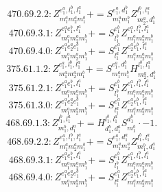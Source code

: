 \documentclass[letterpaper,10pt,fleqn,leqno,onecolumn]{article}
\begin{document}
\begin{equation} \;\;\;\;\;\;  470.69.2.2: Z^{e_{1}^{a},l_{1}^{b},l_{1}^{a}}_{m_{1}^{a}m_{2}^{a}m_{1}^{b}}+=S^{e_{1}^{a},d_{1}^{b}}_{m_{1}^{a}m_{1}^{b}}Z^{l_{1}^{b},l_{1}^{a}}_{m_{2}^{a},d_{1}^{b}} \end{equation}
\begin{equation} \;\;\;\;\;\;  470.69.3.1: Z^{e_{1}^{a}e_{1}^{b},l_{1}^{a}}_{m_{1}^{a}m_{2}^{a}m_{1}^{b}}+=S^{e_{1}^{b}}_{l_{1}^{b}}Z^{e_{1}^{a},l_{1}^{b},l_{1}^{a}}_{m_{1}^{a}m_{2}^{a}m_{1}^{b}} \end{equation}
\begin{equation} \;\;\;\;\;\;  470.69.4.0: Z^{e_{1}^{a}e_{2}^{a}e_{1}^{b}}_{m_{1}^{a}m_{2}^{a}m_{1}^{b}}+=S^{e_{1}^{a}}_{l_{1}^{a}}Z^{e_{2}^{a}e_{1}^{b},l_{1}^{a}}_{m_{1}^{a}m_{2}^{a}m_{1}^{b}} \end{equation}
\begin{equation} \;\;\;\;\;\;  375.61.1.2: Z^{e_{1}^{a},l_{1}^{b},l_{1}^{a}}_{m_{1}^{a}m_{2}^{a}m_{1}^{b}}+=S^{e_{1}^{a},d_{1}^{b}}_{m_{1}^{a}m_{1}^{b}}H^{l_{1}^{b},l_{1}^{a}}_{m_{2}^{a},d_{1}^{b}} \end{equation}
\begin{equation} \;\;\;\;\;\;  375.61.2.1: Z^{e_{1}^{a}e_{1}^{b},l_{1}^{a}}_{m_{1}^{a}m_{2}^{a}m_{1}^{b}}+=S^{e_{1}^{b}}_{l_{1}^{b}}Z^{e_{1}^{a},l_{1}^{b},l_{1}^{a}}_{m_{1}^{a}m_{2}^{a}m_{1}^{b}} \end{equation}
\begin{equation} \;\;\;\;\;\;  375.61.3.0: Z^{e_{1}^{a}e_{2}^{a}e_{1}^{b}}_{m_{1}^{a}m_{2}^{a}m_{1}^{b}}+=S^{e_{1}^{a}}_{l_{1}^{a}}Z^{e_{2}^{a}e_{1}^{b},l_{1}^{a}}_{m_{1}^{a}m_{2}^{a}m_{1}^{b}} \end{equation}
\begin{equation} \;\;\;\;\;\;  468.69.1.3: Z^{l_{1}^{b},l_{1}^{a}}_{m_{1}^{b},d_{1}^{a}}+=H^{l_{1}^{b},l_{1}^{a}}_{d_{1}^{b},d_{1}^{a}}S^{d_{1}^{b}}_{m_{1}^{b}}\cdot -1. \end{equation}
\begin{equation} \;\;\;\;\;\;  468.69.2.2: Z^{e_{1}^{a},l_{1}^{b},l_{1}^{a}}_{m_{1}^{a}m_{2}^{a}m_{1}^{b}}+=S^{e_{1}^{a},d_{1}^{a}}_{m_{1}^{a}m_{2}^{a}}Z^{l_{1}^{b},l_{1}^{a}}_{m_{1}^{b},d_{1}^{a}} \end{equation}
\begin{equation} \;\;\;\;\;\;  468.69.3.1: Z^{e_{1}^{a}e_{1}^{b},l_{1}^{a}}_{m_{1}^{a}m_{2}^{a}m_{1}^{b}}+=S^{e_{1}^{b}}_{l_{1}^{b}}Z^{e_{1}^{a},l_{1}^{b},l_{1}^{a}}_{m_{1}^{a}m_{2}^{a}m_{1}^{b}} \end{equation}
\begin{equation} \;\;\;\;\;\;  468.69.4.0: Z^{e_{1}^{a}e_{2}^{a}e_{1}^{b}}_{m_{1}^{a}m_{2}^{a}m_{1}^{b}}+=S^{e_{1}^{a}}_{l_{1}^{a}}Z^{e_{2}^{a}e_{1}^{b},l_{1}^{a}}_{m_{1}^{a}m_{2}^{a}m_{1}^{b}} \end{equation}
\end{document}

